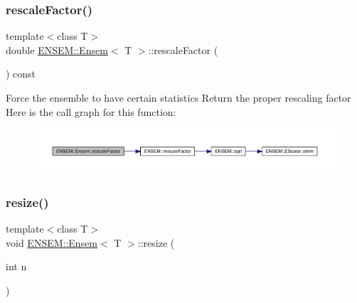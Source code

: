 \mbox{\label{classENSEM_1_1Ensem_aecf90199daafa73454e9c1aceef313a4}} 
\subsubsection{\texorpdfstring{rescaleFactor()}{rescaleFactor()}\hspace{0.1cm}{\footnotesize\ttfamily [3/3]}}
{\footnotesize\ttfamily template$<$class T$>$ \\
double \mbox{\hyperlink{classENSEM_1_1Ensem}{E\+N\+S\+E\+M\+::\+Ensem}}$<$ T $>$\+::rescale\+Factor (\begin{DoxyParamCaption}{ }\end{DoxyParamCaption}) const\hspace{0.3cm}{\ttfamily [inline]}}

Force the ensemble to have certain statistics Return the proper rescaling factor Here is the call graph for this function\+:
\nopagebreak
\begin{figure}[H]
\begin{center}
\leavevmode
\includegraphics[width=350pt]{d7/d3e/classENSEM_1_1Ensem_aecf90199daafa73454e9c1aceef313a4_cgraph}
\end{center}
\end{figure}
\mbox{\label{classENSEM_1_1Ensem_ae43aa68aaca92143baffe83310657f4a}} 
\subsubsection{\texorpdfstring{resize()}{resize()}\hspace{0.1cm}{\footnotesize\ttfamily [1/6]}}
{\footnotesize\ttfamily template$<$class T$>$ \\
void \mbox{\hyperlink{classENSEM_1_1Ensem}{E\+N\+S\+E\+M\+::\+Ensem}}$<$ T $>$\+::resize (\begin{DoxyParamCaption}\item[{int}]{n }\end{DoxyParamCaption})\hspace{0.3cm}{\ttfamily [inline]}}




